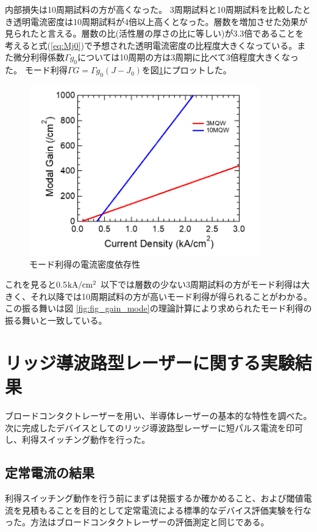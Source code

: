 {内部損失は10周期試料の方が高くなった。
3周期試料と10周期試料を比較したとき透明電流密度は10周期試料が4倍以上高くとなった。層数を増加させた効果が見られたと言える。層数の比(活性層の厚さの比に等しい)が3.3倍であることを考えると式(\ref{eq:Mj0})で予想された透明電流密度の比程度大きくなっている。また微分利得係数$\Gamma g_{0}$については10周期の方は3周期に比べて3倍程度大きくなった。
モード利得$\Gamma G=\Gamma g_{0}(J-J_{0})$を図\ref{fig:fig_3_1_broadcontact_modal_gain}にプロットした。

\begin{figure}[t]
	\centering
	\includegraphics[width=10cm]{figure/fig_3_1_broadcontact_modal_gain.png}
	\caption{モード利得の電流密度依存性}
	\label{fig:fig_3_1_broadcontact_modal_gain}
\end{figure}
これを見ると0.5$ \rm{kA/cm^2}$ 以下では層数の少ない3周期試料の方がモード利得は大きく、それ以降では10周期試料の方が高いモード利得が得られることがわかる。この振る舞いは図	\ref{fig:fig_gain_mode}の理論計算により求められたモード利得の振る舞いと一致している。
\clearpage
\section{リッジ導波路型レーザーに関する実験結果}%
ブロードコンタクトレーザーを用い、半導体レーザーの基本的な特性を調べた。次に完成したデバイスとしてのリッジ導波路型レーザーに短パルス電流を印可し、利得スイッチング動作を行った。
\subsection{定常電流の結果}

利得スイッチング動作を行う前にまずは発振するか確かめること、および閾値電流を見積もることを目的として定常電流による標準的なデバイス評価実験を行なった。方法はブロードコンタクトレーザーの評価測定と同じである。
}
